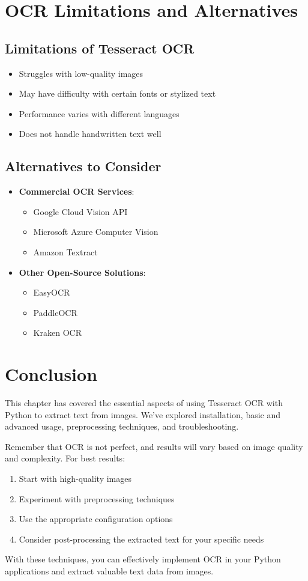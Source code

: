 \section{OCR Limitations and Alternatives}

\subsection{Limitations of Tesseract OCR}
\begin{itemize}
	\item Struggles with low-quality images
	\item May have difficulty with certain fonts or stylized text
	\item Performance varies with different languages
	\item Does not handle handwritten text well
\end{itemize}

\subsection{Alternatives to Consider}
\begin{itemize}
	\item \textbf{Commercial OCR Services}: 
	\begin{itemize}
		\item Google Cloud Vision API
		\item Microsoft Azure Computer Vision
		\item Amazon Textract
	\end{itemize}
	
	\item \textbf{Other Open-Source Solutions}:
	\begin{itemize}
		\item EasyOCR
		\item PaddleOCR
		\item Kraken OCR
	\end{itemize}
\end{itemize}

\section{Conclusion}
This chapter has covered the essential aspects of using Tesseract OCR with Python to extract text from images. We've explored installation, basic and advanced usage, preprocessing techniques, and troubleshooting.

Remember that OCR is not perfect, and results will vary based on image quality and complexity. For best results:
\begin{enumerate}
	\item Start with high-quality images
	\item Experiment with preprocessing techniques
	\item Use the appropriate configuration options
	\item Consider post-processing the extracted text for your specific needs
\end{enumerate}

With these techniques, you can effectively implement OCR in your Python applications and extract valuable text data from images.